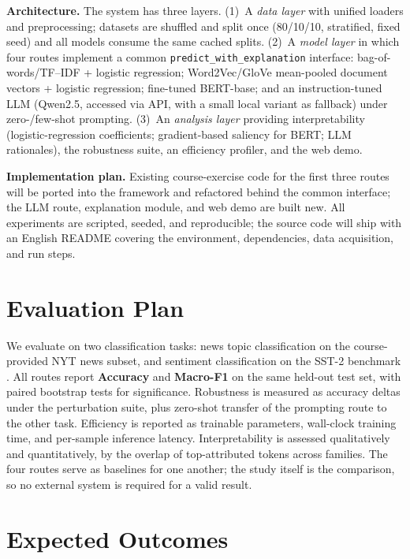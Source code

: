 \documentclass[11pt]{article}
\begin{document}
\textbf{Architecture.} The system has three layers. (1)~A \emph{data layer} with unified loaders and preprocessing; datasets are shuffled and split once (80/10/10, stratified, fixed seed) and all models consume the same cached splits. (2)~A \emph{model layer} in which four routes implement a common \texttt{predict\_with\_explanation} interface: bag-of-words/TF--IDF + logistic regression; Word2Vec/GloVe mean-pooled document vectors + logistic regression; fine-tuned BERT-base; and an instruction-tuned LLM (Qwen2.5, accessed via API, with a small local variant as fallback) under zero-/few-shot prompting. (3)~An \emph{analysis layer} providing interpretability (logistic-regression coefficients; gradient-based saliency for BERT; LLM rationales), the robustness suite, an efficiency profiler, and the web demo.

\textbf{Implementation plan.} Existing course-exercise code for the first three routes will be ported into the framework and refactored behind the common interface; the LLM route, explanation module, and web demo are built new. All experiments are scripted, seeded, and reproducible; the source code will ship with an English README covering the environment, dependencies, data acquisition, and run steps.

\section{Evaluation Plan}

We evaluate on two classification tasks: news topic classification on the course-provided NYT news subset, and sentiment classification on the SST-2 benchmark \citep{socher-2013-recursive}. All routes report \textbf{Accuracy} and \textbf{Macro-F1} on the same held-out test set, with paired bootstrap tests for significance. Robustness is measured as accuracy deltas under the perturbation suite, plus zero-shot transfer of the prompting route to the other task. Efficiency is reported as trainable parameters, wall-clock training time, and per-sample inference latency. Interpretability is assessed qualitatively and quantitatively, by the overlap of top-attributed tokens across families. The four routes serve as baselines for one another; the study itself is the comparison, so no external system is required for a valid result.

\section{Expected Outcomes}
\end{document}

